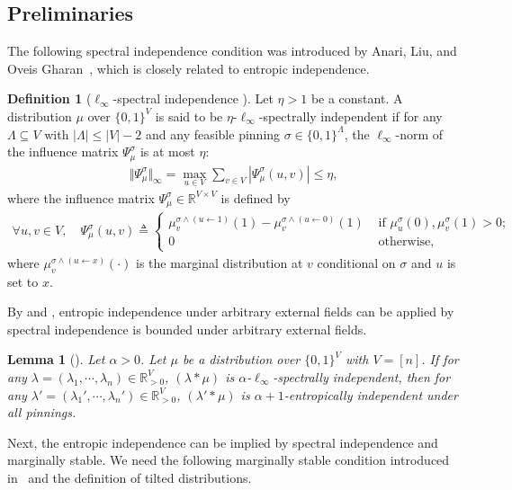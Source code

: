 \documentclass[11pt,a4paper]{article}
\newtheorem{lemma}[theorem]{Lemma}
\theoremstyle{definition}
\newtheorem{definition}[theorem]{Definition}
\newcommand{\defeq}{\triangleq}
\begin{document}
\subsection{Preliminaries}
The following spectral independence condition was introduced by Anari, Liu, and Oveis Gharan~\cite{ALO20}, which is closely related to entropic independence.
\begin{definition}[$\ell_\infty$-spectral independence \cite{ALO20}]
Let $\eta > 1$ be a constant.
A distribution $\mu$ over $\{0,1\}^V$ is said to be $\eta$-$\ell_\infty$-spectrally independent if for any $\Lambda \subseteq V$ with $|\Lambda| \leq |V| - 2$ and any feasible pinning $\sigma \in \{0,1\}^{\Lambda}$, the $\ell_\infty$-norm of the influence matrix $\Psi_\mu^\sigma$ is at most $\eta$:
\begin{align*}
  \Vert \Psi_\mu^\sigma \Vert_\infty =  \max_{u \in V} \sum_{v \in V} |\Psi_\mu^\sigma(u,v)| \leq \eta,
\end{align*} 
where the influence matrix $\Psi_\mu^\sigma \in \mathbb{R}^{V \times V}$ is defined by 
\begin{align*}
\forall u,v \in V, \quad \Psi_\mu^\sigma(u,v) \defeq \begin{cases}
\mu^{\sigma \land (u \gets 1)}_v(1) - \mu^{\sigma \land (u \gets 0)}_v(1) &\text{ if } \mu_u^\sigma(0),\mu_v^\sigma(1)>0;\\
0 & \text{ otherwise},
\end{cases}
\end{align*}
where $\mu^{\sigma \land (u \gets x)}_v(\cdot)$ is the marginal distribution at $v$ conditional on $\sigma$ and $u$ is set to $x$.
\end{definition}

By \cite{AJKPV22} and \cite{AASV21}, entropic independence under arbitrary external fields can be applied by spectral independence is bounded under arbitrary external fields.

\begin{lemma}[]\label{lem:equiv-EI-SI}
    Let $\alpha > 0$.
Let $\mu$ be a distribution over $\{0,1\}^V$ with $V = [n]$. If for any $\lambda=(\lambda_1,\cdots,\lambda_n)\in \mathbb{R}_{> 0}^{V}$, $(\lambda*\mu)$ is $\alpha$-$\ell_\infty$-spectrally independent, then for any $\lambda'=(\lambda_1',\cdots,\lambda_n')\in \mathbb{R}_{> 0}^{V}$, $(\lambda'*\mu)$ is $\alpha+1$-entropically independent under all pinnings.
\end{lemma}

Next, the entropic independence can be implied by spectral independence and marginally stable.
We need the following marginally stable condition introduced in~\cite{CFYZ22,ChenE22} and the definition of tilted distributions.
\end{document}
